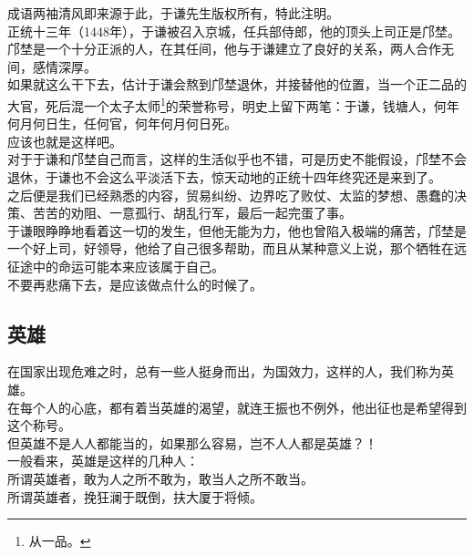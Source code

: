 \begin{multicols}{\theparacolNo}
成语两袖清风即来源于此，于谦先生版权所有，特此注明。\\

正统十三年（1448年），于谦被召入京城，任兵部侍郎，他的顶头上司正是邝埜。\\

邝埜是一个十分正派的人，在其任间，他与于谦建立了良好的关系，两人合作无间，感情深厚。\\

如果就这么干下去，估计于谦会熬到邝埜退休，并接替他的位置，当一个正二品的大官，死后混一个太子太师\footnote{从一品。}的荣誉称号，明史上留下两笔：于谦，钱塘人，何年何月何日生，任何官，何年何月何日死。\\

应该也就是这样吧。\\

对于于谦和邝埜自己而言，这样的生活似乎也不错，可是历史不能假设，邝埜不会退休，于谦也不会这么平淡活下去，惊天动地的正统十四年终究还是来到了。\\

之后便是我们已经熟悉的内容，贸易纠纷、边界吃了败仗、太监的梦想、愚蠢的决策、苦苦的劝阻、一意孤行、胡乱行军，最后一起完蛋了事。\\

于谦眼睁睁地看着这一切的发生，但他无能为力，他也曾陷入极端的痛苦，邝埜是一个好上司，好领导，他给了自己很多帮助，而且从某种意义上说，那个牺牲在远征途中的命运可能本来应该属于自己。\\

不要再悲痛下去，是应该做点什么的时候了。\\

\subsection{英雄}
在国家出现危难之时，总有一些人挺身而出，为国效力，这样的人，我们称为英雄。\\

在每个人的心底，都有着当英雄的渴望，就连王振也不例外，他出征也是希望得到这个称号。\\

但英雄不是人人都能当的，如果那么容易，岂不人人都是英雄？！\\

一般看来，英雄是这样的几种人：\\

所谓英雄者，敢为人之所不敢为，敢当人之所不敢当。\\

所谓英雄者，挽狂澜于既倒，扶大厦于将倾。\\


\end{multicols}
